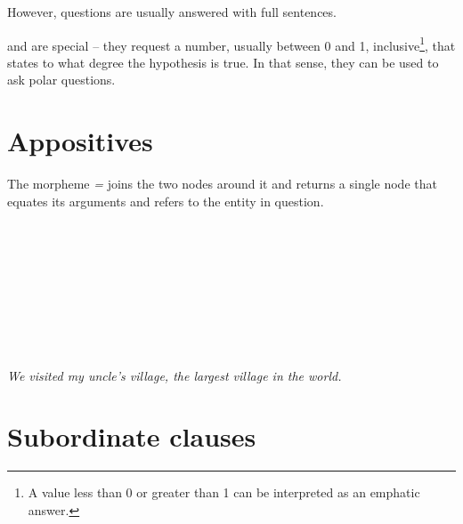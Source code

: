 \documentclass{book}
\begin{document}
However,  questions are usually answered with full sentences.

 and  are special -- they request a number, usually between 0 and 1, inclusive\footnote{A value less than 0 or greater than 1 can be interpreted as an emphatic answer.}, that states to what degree the hypothesis is true. In that sense, they can be used to ask polar questions.

\section{Appositives}

The morpheme  \emph{=} joins the two nodes around it and returns a single node that equates its arguments and refers to the entity in question. \\
~\\
 \\
 \\
     \hlvi{$\lrcorner$}  \hlviii{$\lrcorner$} \hlix{=} \\
~\\
 \\
 \\
    \\
~\\
\emph{We visited my uncle's village, the largest village in the world.}

\section{Subordinate clauses}
\end{document}

